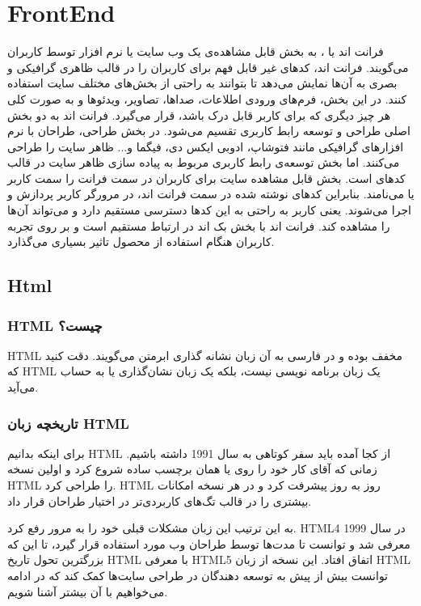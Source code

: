 \section{FrontEnd}
فرانت اند یا
، به بخش قابل مشاهده‌ی یک وب سایت یا نرم افزار توسط کاربران می‌گویند. فرانت اند، کدهای غیر قابل فهم برای کاربران را در قالب ظاهری گرافیکی و بصری به آن‌ها نمایش می‌دهد تا بتوانند به راحتی از بخش‌های مختلف سایت استفاده کنند. در این بخش، فرم‌های ورودی اطلاعات، صداها، تصاویر، ویدئوها و به صورت کلی هر چیز دیگری که برای کاربر قابل درک باشد، قرار می‌گیرد.
فرانت اند به دو بخش اصلی طراحی و توسعه رابط کاربری تقسیم می‌شود. در بخش طراحی، طراحان با نرم افزارهای گرافیکی مانند فتوشاپ، ادوبی ایکس دی، فیگما و... ظاهر سایت را طراحی می‌کنند. اما بخش توسعه‌ی رابط کاربری مربوط به پیاده سازی ظاهر سایت در قالب کدهای
است. بخش قابل مشاهده‌ سایت برای کاربران در سمت فرانت را سمت کاربر یا
 می‌نامند. بنابراین کدهای نوشته شده در سمت فرانت اند، در مرورگر کاربر پردازش و اجرا می‌شوند. یعنی کاربر به راحتی به این کدها دسترسی مستقیم دارد و می‌تواند آن‌ها را مشاهده کند. فرانت اند 
  با بخش بک اند 
   در ارتباط مستقیم است و بر روی تجربه کاربران هنگام استفاده از محصول تاثیر بسیاری می‌گذارد.

\subsection{Html}
\subsubsection{HTML چیست؟}
HTML
 مخفف 
 بوده و در فارسی به آن زبان نشانه‌ گذاری ابرمتن می‌گویند. دقت کنید که HTML یک زبان برنامه نویسی نیست، بلکه یک زبان نشان‌گذاری یا 
  به حساب می‌آید.

\subsubsection{تاریخچه زبان HTML}
برای اینکه بدانیم HTML از کجا آمده باید سفر کوتاهی به سال 1991 داشته باشیم. زمانی که آقای 
 کار خود را روی 
  یا همان برچسب ساده شروع کرد و اولین نسخه HTML را طراحی کرد. HTML روز به روز پیشرفت کرد و در هر نسخه امکانات بیشتری را در قالب تگ‌‌های کاربردی‌تر در اختیار طراحان قرار داد.

به این ترتیب این زبان مشکلات قبلی خود را به مرور رفع کرد. HTML4 در سال 1999 معرفی شد و توانست تا مدت‌ها توسط طراحان وب مورد استفاده قرار گیرد، تا این که بزرگترین تحول تاریخ HTML با معرفی HTML5 اتفاق افتاد. این نسخه از زبان HTML توانست بیش از پیش به توسعه دهندگان در طراحی سایت‌ها کمک کند که در ادامه می‌خواهیم با آن بیشتر آشنا شویم.


